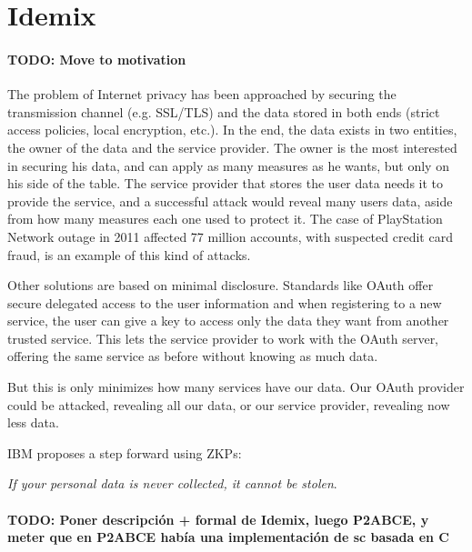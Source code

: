 


\section{Idemix}

\paragraph{TODO: Move to motivation}

The problem of Internet privacy has been approached by securing the transmission channel (e.g. SSL/TLS) and the data stored in both ends (strict access policies, local encryption, etc.). In the end, the data exists in two entities, the owner of the data and the service provider. The owner is the most interested in securing his data, and can apply as many measures as he wants, but only on his side of the table. The service provider that stores the user data needs it to provide the service, and a successful attack would reveal many users data, aside from how many measures each one used to protect it. The case of PlayStation Network outage in 2011 \citep{PSN2011} affected 77 million accounts, with suspected credit card fraud, is an example of this kind of attacks.

\hfil


Other solutions are based on minimal disclosure. Standards like OAuth offer secure delegated access to the user information and when registering to a new service, the user can give a key to access only the data they want from another trusted service. This lets the service provider to work with the OAuth server, offering the same service as before without knowing as much data.

But this is only minimizes how many services have our data. Our OAuth provider could be attacked, revealing all our data, or our service provider, revealing now less data.

\hfill

IBM proposes a step forward using \aclp{ZKP}:


\begin{center}
	\textit{If your personal data is never collected, it cannot be stolen}.
\end{center}

\paragraph{TODO: Poner descripción + formal de Idemix, luego P2ABCE, y meter que en P2ABCE había una implementación de sc basada en C}



